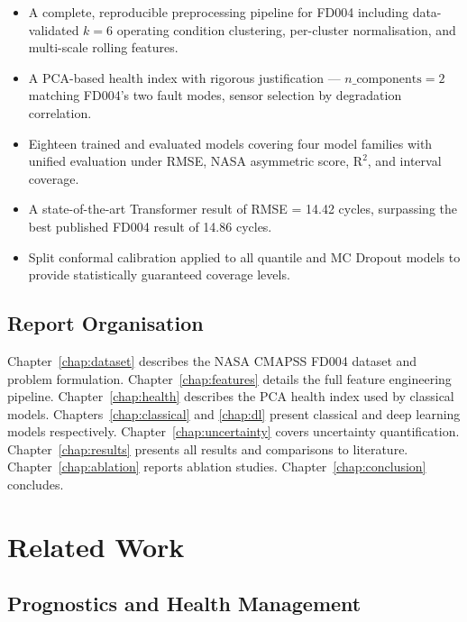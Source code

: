 \documentclass[12pt,a4paper]{report}
\begin{document}
\begin{itemize}[leftmargin=1.5cm]
  \item A complete, reproducible preprocessing pipeline for FD004 including data-validated $k=6$ operating condition clustering, per-cluster normalisation, and multi-scale rolling features.
  \item A PCA-based health index with rigorous justification — $n\_\text{components}=2$ matching FD004's two fault modes, sensor selection by degradation correlation.
  \item Eighteen trained and evaluated models covering four model families with unified evaluation under RMSE, NASA asymmetric score, $\text{R}^2$, and interval coverage.
  \item A state-of-the-art Transformer result of RMSE = 14.42 cycles, surpassing the best published FD004 result of 14.86 cycles.
  \item Split conformal calibration applied to all quantile and MC Dropout models to provide statistically guaranteed coverage levels.
\end{itemize}

\section{Report Organisation}

Chapter~\ref{chap:dataset} describes the NASA CMAPSS FD004 dataset and problem formulation. Chapter~\ref{chap:features} details the full feature engineering pipeline. Chapter~\ref{chap:health} describes the PCA health index used by classical models. Chapters~\ref{chap:classical} and \ref{chap:dl} present classical and deep learning models respectively. Chapter~\ref{chap:uncertainty} covers uncertainty quantification. Chapter~\ref{chap:results} presents all results and comparisons to literature. Chapter~\ref{chap:ablation} reports ablation studies. Chapter~\ref{chap:conclusion} concludes.

\chapter{Related Work}

\section{Prognostics and Health Management}
\end{document}
